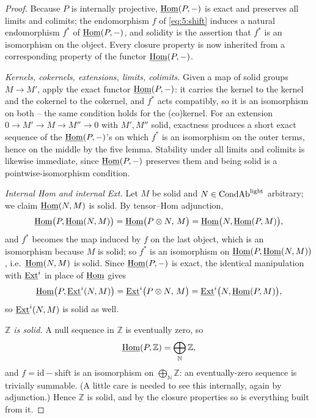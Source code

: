 \begin{proof}
Because $P$ is internally projective, $\underline{\operatorname{Hom}}(P,-)$ is exact and preserves all
limits and colimits; the endomorphism $f$ of \eqref{eq:5:shift} induces a natural
endomorphism $f^\ast$ of $\underline{\operatorname{Hom}}(P,-)$, and solidity is the assertion that $f^\ast$
is an isomorphism on the object. Every closure property is now inherited from a
corresponding property of the functor $\underline{\operatorname{Hom}}(P,-)$.

\emph{Kernels, cokernels, extensions, limits, colimits.} Given a map of solid
groups $M\to M'$, apply the exact functor $\underline{\operatorname{Hom}}(P,-)$: it carries the kernel to
the kernel and the cokernel to the cokernel, and $f^\ast$ acts compatibly, so it
is an isomorphism on both -- the same condition holds for the (co)kernel. For an
extension $0\to M'\to M\to M''\to 0$ with $M',M''$ solid, exactness produces a
short exact sequence of the $\underline{\operatorname{Hom}}(P,-)$'s on which $f^\ast$ is an isomorphism on
the outer terms, hence on the middle by the five lemma. Stability under all limits
and colimits is likewise immediate, since $\underline{\operatorname{Hom}}(P,-)$ preserves them and being
solid is a pointwise-isomorphism condition.

\emph{Internal Hom and internal Ext.} Let $M$ be solid and $N\in\mathrm{CondAb}^{\mathrm{light}}$
arbitrary; we claim $\underline{\operatorname{Hom}}(N,M)$ is solid. By tensor--Hom adjunction,
\begin{equation*}
\underline{\operatorname{Hom}}\bigl(P,\underline{\operatorname{Hom}}(N,M)\bigr)
=\underline{\operatorname{Hom}}\bigl(P\otimes N,\,M\bigr)
=\underline{\operatorname{Hom}}\bigl(N,\underline{\operatorname{Hom}}(P,M)\bigr),
\end{equation*}
and $f^\ast$ becomes the map induced by $f$ on the last object, which is an
isomorphism because $M$ is solid; so $f^\ast$ is an isomorphism on
$\underline{\operatorname{Hom}}(P,\underline{\operatorname{Hom}}(N,M))$, i.e.\ $\underline{\operatorname{Hom}}(N,M)$ is solid. Since $\underline{\operatorname{Hom}}(P,-)$ is exact,
the identical manipulation with $\underline{\operatorname{Ext}}^i$ in place of $\underline{\operatorname{Hom}}$ gives
\begin{equation*}
\underline{\operatorname{Hom}}\bigl(P,\underline{\operatorname{Ext}}^{i}(N,M)\bigr)=\underline{\operatorname{Ext}}^{i}\bigl(P\otimes N,\,M\bigr)
=\underline{\operatorname{Ext}}^{i}\bigl(N,\underline{\operatorname{Hom}}(P,M)\bigr),
\end{equation*}
so $\underline{\operatorname{Ext}}^{i}(N,M)$ is solid as well.

\emph{$\mathbb{Z}$ is solid.} A null sequence in $\mathbb{Z}$ is eventually zero,
so
\begin{equation}
\label{eq:5:hom-P-Z}
\underline{\operatorname{Hom}}(P,\mathbb{Z})=\bigoplus_{\mathbb{N}}\mathbb{Z},
\end{equation}
and $f=\mathrm{id}-\mathrm{shift}$ is an isomorphism on $\bigoplus_{\mathbb{N}}
\mathbb{Z}$: an eventually-zero sequence is trivially summable. (A little care is
needed to see this internally, again by adjunction.) Hence $\mathbb{Z}$ is solid,
and by the closure properties so is everything built from it.
\end{proof}

